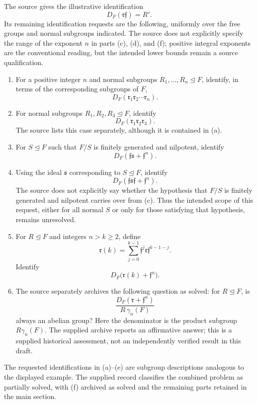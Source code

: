 \documentclass[11pt]{article}
\begin{document}
The source gives the illustrative identification
\[
D_F(\mathfrak r\mathfrak f)=R'.
\]
Its remaining identification requests are the following, uniformly over the free groups and normal subgroups indicated. The source does not explicitly specify the range of the exponent \(n\) in parts (c), (d), and (f); positive integral exponents are the conventional reading, but the intended lower bounds remain a source qualification.
\begin{enumerate}
\item[(a)] For a positive integer \(n\) and normal subgroups \(R_1,\ldots,R_n\trianglelefteq F\), identify, in terms of the corresponding subgroups of \(F\),
\[
D_F(\mathfrak r_1\mathfrak r_2\cdots\mathfrak r_n).
\]
\item[(b)] For normal subgroups \(R_1,R_2,R_3\trianglelefteq F\), identify
\[
D_F(\mathfrak r_1\mathfrak r_2\mathfrak r_3).
\]
The source lists this case separately, although it is contained in (a).
\item[(c)] For \(S\trianglelefteq F\) such that \(F/S\) is finitely generated and nilpotent, identify
\[
D_F(\mathfrak f\mathfrak s+\mathfrak f^n).
\]
\item[(d)] Using the ideal \(\mathfrak s\) corresponding to \(S\trianglelefteq F\), identify
\[
D_F(\mathfrak f\mathfrak s\mathfrak f+\mathfrak f^n).
\]
The source does not explicitly say whether the hypothesis that \(F/S\) is finitely generated and nilpotent carries over from (c). Thus the intended scope of this request, either for all normal \(S\) or only for those satisfying that hypothesis, remains unresolved.
\item[(e)] For \(R\trianglelefteq F\) and integers \(n>k\geq2\), define
\[
\mathfrak r(k)=\sum_{j=0}^{k-1}\mathfrak f^j\mathfrak r\mathfrak f^{k-1-j}.
\]
Identify
\[
D_F\bigl(\mathfrak r(k)+\mathfrak f^n\bigr).
\]
\item[(f)] The source separately archives the following question as solved: for \(R\trianglelefteq F\), is
\[
\frac{D_F(\mathfrak r+\mathfrak f^n)}{R\,\gamma_n(F)}
\]
always an abelian group? Here the denominator is the product subgroup \(R\gamma_n(F)\). The supplied archive reports an affirmative answer; this is a supplied historical assessment, not an independently verified result in this draft.
\end{enumerate}
The requested identifications in (a)--(e) are subgroup descriptions analogous to the displayed example. The supplied record classifies the combined problem as partially solved, with (f) archived as solved and the remaining parts retained in the main section.
\end{document}
